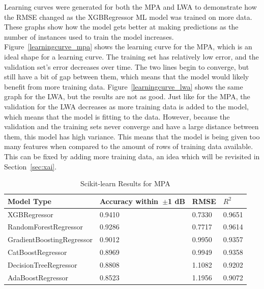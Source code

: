 \documentclass[conference]{IEEEtran}
\begin{document}
Learning curves were generated for both the MPA and LWA to demonstrate how the RMSE changed as the XGBRegressor ML model was trained on more data. These graphs show how the model gets better at making predictions as the number of instances used to train the model increases. Figure~\ref{learningcurve_mpa} shows the learning curve for the MPA, which is an ideal shape for a learning curve. The training set has relatively low error, and the validation set's error decreases over time. The two lines begin to converge, but still have a bit of gap between them, which means that the model would likely benefit from more training data. Figure~\ref{learningcurve_lwa} shows the same graph for the LWA, but the results are not as good. Just like for the MPA, the validation for the LWA decreases as more training data is added to the model, which means that the model is fitting to the data. However, because the validation and the training sets never converge and have a large distance between them, this model has high variance. This means that the model is being given too many features when compared to the amount of rows of training data available. This can be fixed by adding more training data, an idea which will be revisited in Section~\ref{sec:xai}.


\begin{table}[H]
    \caption{Scikit-learn Results for MPA}
    \begin{center}
    \begin{tabular}{ |l|p{1.7cm}|l|l| }
        \hline
        Model Type & Accuracy within~$\pm$1 dB & RMSE & $R^2$ \\ 
        \hline
        XGBRegressor & 0.9410 & 0.7330 & 0.9651 \\  
        \hline
        RandomForestRegressor & 0.9286 & 0.7717 & 0.9614 \\
        \hline  
        GradientBoostingRegressor & 0.9012 & 0.9950 & 0.9357 \\
        \hline
        CatBoostRegressor & 0.8969 & 0.9949 & 0.9358 \\    
        \hline
        DecisionTreeRegressor & 0.8808 & 1.1082 & 0.9202 \\  
        \hline
        AdaBoostRegressor & 0.8523 & 1.1956 & 0.9072 \\  
        \hline
    \end{tabular}
    \end{center}
\label{comparing_sklearn_p}
\end{table}
\end{document}

